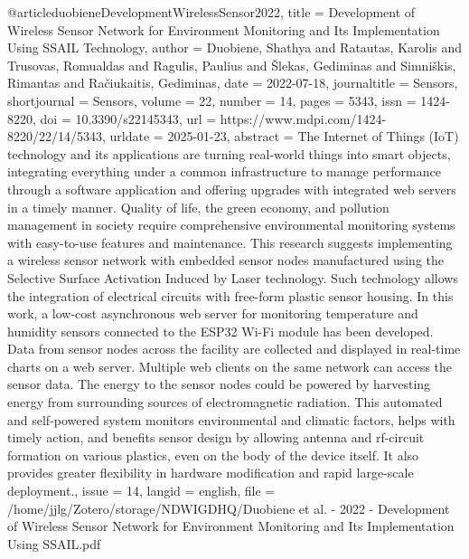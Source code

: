 {{{@article{duobieneDevelopmentWirelessSensor2022,
  title = {Development of {{Wireless Sensor Network}} for {{Environment Monitoring}} and {{Its Implementation Using SSAIL Technology}}},
  author = {Duobiene, Shathya and Ratautas, Karolis and Trusovas, Romualdas and Ragulis, Paulius and Šlekas, Gediminas and Simniškis, Rimantas and Račiukaitis, Gediminas},
  date = {2022-07-18},
  journaltitle = {Sensors},
  shortjournal = {Sensors},
  volume = {22},
  number = {14},
  pages = {5343},
  issn = {1424-8220},
  doi = {10.3390/s22145343},
  url = {https://www.mdpi.com/1424-8220/22/14/5343},
  urldate = {2025-01-23},
  abstract = {The Internet of Things (IoT) technology and its applications are turning real-world things into smart objects, integrating everything under a common infrastructure to manage performance through a software application and offering upgrades with integrated web servers in a timely manner. Quality of life, the green economy, and pollution management in society require comprehensive environmental monitoring systems with easy-to-use features and maintenance. This research suggests implementing a wireless sensor network with embedded sensor nodes manufactured using the Selective Surface Activation Induced by Laser technology. Such technology allows the integration of electrical circuits with free-form plastic sensor housing. In this work, a low-cost asynchronous web server for monitoring temperature and humidity sensors connected to the ESP32 Wi-Fi module has been developed. Data from sensor nodes across the facility are collected and displayed in real-time charts on a web server. Multiple web clients on the same network can access the sensor data. The energy to the sensor nodes could be powered by harvesting energy from surrounding sources of electromagnetic radiation. This automated and self-powered system monitors environmental and climatic factors, helps with timely action, and benefits sensor design by allowing antenna and rf-circuit formation on various plastics, even on the body of the device itself. It also provides greater flexibility in hardware modification and rapid large-scale deployment.},
  issue = {14},
  langid = {english},
  file = {/home/jjlg/Zotero/storage/NDWIGDHQ/Duobiene et al. - 2022 - Development of Wireless Sensor Network for Environment Monitoring and Its Implementation Using SSAIL.pdf}
}

}}}
